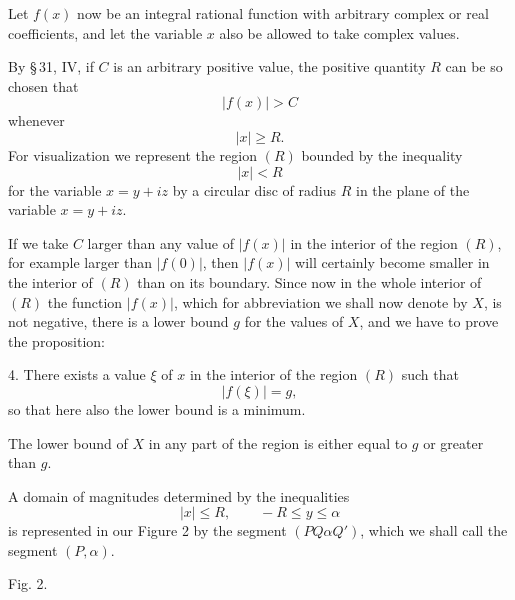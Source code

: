 \documentclass[11pt]{article}
\begin{document}
Let $f(x)$ now be an integral rational function with arbitrary complex or real coefficients, and let the variable $x$ also be allowed to take complex values.

By \S\,31, IV, if $C$ is an arbitrary positive value, the positive quantity $R$ can be so chosen that
\begin{equation}
 |f(x)|>C
\tag{4}
\end{equation}
whenever
\begin{equation}
 |x|\ge R.
\tag{5}
\end{equation}
For visualization we represent the region $(R)$ bounded by the inequality
\[
 |x|<R
\]
for the variable $x=y+iz$ by a circular disc of radius $R$ in the plane of the variable $x=y+iz$.

If we take $C$ larger than any value of $|f(x)|$ in the interior of the region $(R)$, for example larger than $|f(0)|$, then $|f(x)|$ will certainly become smaller in the interior of $(R)$ than on its boundary. Since now in the whole interior of $(R)$ the function $|f(x)|$, which for abbreviation we shall now denote by $X$, is not negative, there is a lower bound $g$ for the values of $X$, and we have to prove the proposition:

4. There exists a value $\xi$ of $x$ in the interior of the region $(R)$ such that
\begin{equation}
 |f(\xi)|=g,
\tag{6}
\end{equation}
so that here also the lower bound is a minimum.

The lower bound of $X$ in any part of the region is either equal to $g$ or greater than $g$.

A domain of magnitudes determined by the inequalities
\begin{equation}
 |x|\le R,\qquad -R\le y\le \alpha
\tag{7}
\end{equation}
is represented in our Figure 2 by the segment $(PQ\alpha Q')$, which we shall call the segment $(P,\alpha)$.

\begin{center}{\small Fig. 2.}\end{center}

\begin{center}
\end{center}
\end{document}
